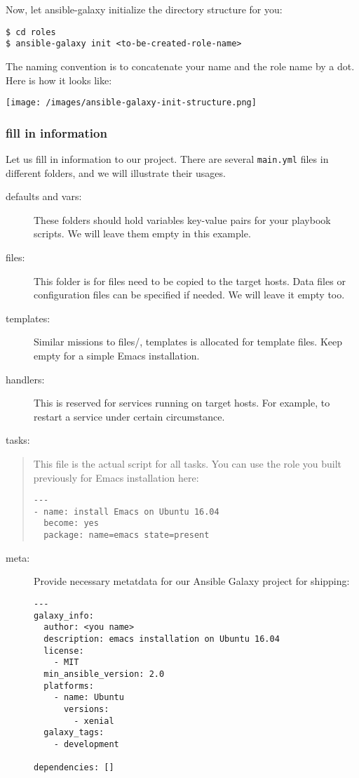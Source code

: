 Now, let ansible-galaxy initialize the directory structure for you:

\begin{verbatim}
$ cd roles
$ ansible-galaxy init <to-be-created-role-name>
\end{verbatim}

The naming convention is to concatenate your name and the role name by a
dot. Here is how it looks like:

\texttt{[image: /images/ansible-galaxy-init-structure.png]}

\subsubsection{fill in information}\label{fill-in-information}

Let us fill in information to our project. There are several
\texttt{main.yml} files in different folders, and we will illustrate
their usages.

\begin{description}
\item[defaults and vars:]
These folders should hold variables key-value pairs for your playbook
scripts. We will leave them empty in this example.
\item[files:]
This folder is for files need to be copied to the target hosts. Data
files or configuration files can be specified if needed. We will leave
it empty too.
\item[templates:]
Similar missions to files/, templates is allocated for template files.
Keep empty for a simple Emacs installation.
\item[handlers:]
This is reserved for services running on target hosts. For example, to
restart a service under certain circumstance.
\end{description}

tasks:

\begin{quote}
This file is the actual script for all tasks. You can use the role you
built previously for Emacs installation here:

\begin{verbatim}
---
- name: install Emacs on Ubuntu 16.04
  become: yes
  package: name=emacs state=present
\end{verbatim}
\end{quote}

\begin{description}
\item[meta:]
Provide necessary metatdata for our Ansible Galaxy project for shipping:

\begin{verbatim}
---
galaxy_info:
  author: <you name>
  description: emacs installation on Ubuntu 16.04
  license:
    - MIT
  min_ansible_version: 2.0
  platforms:
    - name: Ubuntu
      versions:
        - xenial
  galaxy_tags:
    - development

dependencies: []
\end{verbatim}
\end{description}

